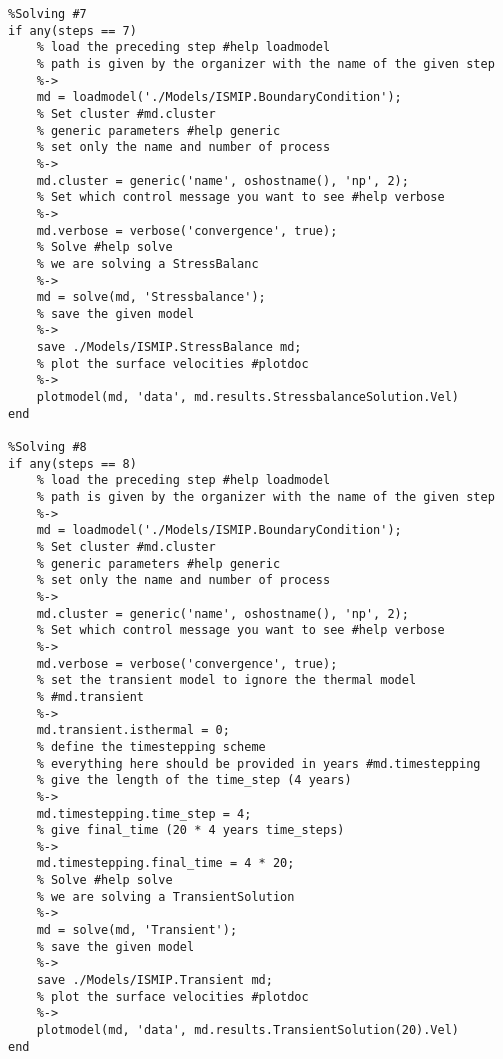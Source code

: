 \begin{lstlisting}
%Solving #7
if any(steps == 7)
	% load the preceding step #help loadmodel
	% path is given by the organizer with the name of the given step
	%->
	md = loadmodel('./Models/ISMIP.BoundaryCondition');
	% Set cluster #md.cluster
	% generic parameters #help generic
	% set only the name and number of process
	%->
	md.cluster = generic('name', oshostname(), 'np', 2);
	% Set which control message you want to see #help verbose
	%->
	md.verbose = verbose('convergence', true);
	% Solve #help solve
	% we are solving a StressBalanc
	%->
	md = solve(md, 'Stressbalance');
	% save the given model
	%->
	save ./Models/ISMIP.StressBalance md;
	% plot the surface velocities #plotdoc
	%->
	plotmodel(md, 'data', md.results.StressbalanceSolution.Vel)
end

%Solving #8
if any(steps == 8)
	% load the preceding step #help loadmodel
	% path is given by the organizer with the name of the given step
	%->
	md = loadmodel('./Models/ISMIP.BoundaryCondition');
	% Set cluster #md.cluster
	% generic parameters #help generic
	% set only the name and number of process
	%->
	md.cluster = generic('name', oshostname(), 'np', 2);
	% Set which control message you want to see #help verbose
	%->
	md.verbose = verbose('convergence', true);
	% set the transient model to ignore the thermal model
	% #md.transient
	%->
	md.transient.isthermal = 0;
	% define the timestepping scheme
	% everything here should be provided in years #md.timestepping
	% give the length of the time_step (4 years)
	%->
	md.timestepping.time_step = 4;
	% give final_time (20 * 4 years time_steps)
	%->
	md.timestepping.final_time = 4 * 20;
	% Solve #help solve
	% we are solving a TransientSolution
	%->
	md = solve(md, 'Transient');
	% save the given model
	%->
	save ./Models/ISMIP.Transient md;
	% plot the surface velocities #plotdoc
	%->
	plotmodel(md, 'data', md.results.TransientSolution(20).Vel)
end
\end{lstlisting}
